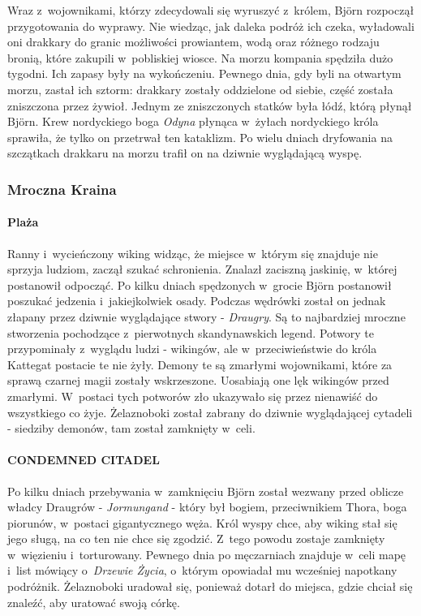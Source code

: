 \documentclass[12pt,a4paper,oneside]{book}
\theoremstyle{definition}
\numberwithin{equation}{chapter}
\begin{document}
\par Wraz z~wojownikami, którzy zdecydowali się wyruszyć z~królem, Björn rozpoczął przygotowania do wyprawy. Nie wiedząc, jak daleka podróż ich czeka, wyładowali oni drakkary do granic możliwości prowiantem, wodą oraz różnego rodzaju bronią, które zakupili w~pobliskiej wiosce. Na morzu kompania spędziła dużo tygodni. Ich zapasy były na wykończeniu. Pewnego dnia, gdy byli na otwartym morzu, zastał ich sztorm: drakkary zostały oddzielone od siebie, część została zniszczona przez żywioł. Jednym ze zniszczonych statków była łódź, którą płynął Björn. Krew nordyckiego boga \textit{Odyna} płynąca w~żyłach nordyckiego króla sprawiła, że tylko on przetrwał ten kataklizm. Po wielu dniach dryfowania na szczątkach drakkaru na morzu trafił on na dziwnie wyglądającą wyspę.

\subsubsection{Mroczna Kraina}
\paragraph{Plaża}\hfill \break
\par Ranny i~wycieńczony wiking widząc, że miejsce w~którym się znajduje nie sprzyja ludziom, zaczął szukać schronienia. Znalazł zaciszną jaskinię, w~której postanowił odpocząć. Po kilku dniach spędzonych w~grocie Björn postanowił poszukać jedzenia i~jakiejkolwiek osady. Podczas wędrówki został on jednak złapany przez dziwnie wyglądające stwory - \textit{Draugry}\cite{Draugr}. Są to najbardziej mroczne stworzenia pochodzące z~pierwotnych skandynawskich legend. Potwory te przypominały z~wyglądu ludzi - wikingów, ale w~przeciwieństwie do króla Kattegat postacie te nie żyły. Demony te są zmarłymi wojownikami, które za sprawą czarnej magii zostały wskrzeszone. Uosabiają one lęk wikingów przed zmarłymi. W~postaci tych potworów zło ukazywało się przez nienawiść do wszystkiego co żyje. Żelaznoboki został zabrany do dziwnie wyglądającej cytadeli - siedziby demonów, tam został zamknięty w~celi.

\paragraph{CONDEMNED CITADEL}\hfill \break
\par Po kilku dniach przebywania w~zamknięciu Björn został wezwany przed oblicze władcy Draugrów - \textit{Jormungand} - który był bogiem, przeciwnikiem Thora, boga piorunów, w~postaci gigantycznego węża. Król wyspy chce, aby wiking stał się jego sługą, na co ten nie chce się zgodzić. Z~tego powodu zostaje zamknięty w~więzieniu i~torturowany. Pewnego dnia po męczarniach znajduje w~celi mapę i~list mówiący o~\textit{Drzewie Życia}, o~którym opowiadał mu wcześniej napotkany podróżnik. Żelaznoboki uradował się, ponieważ dotarł do miejsca, gdzie chciał się znaleźć, aby uratować swoją córkę. 
\end{document}
